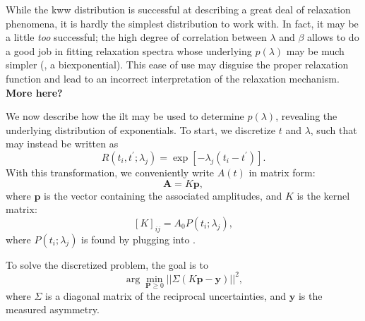 While the \gls{kww} distribution is successful at describing a great deal of relaxation phenomena, it is hardly the simplest distribution to work with.
In fact, it may be a little \emph{too} successful;
the high degree of correlation between $\lambda$ and $\beta$ allows  to do a good job in fitting relaxation spectra whose underlying $p ( \lambda )$ may be much simpler (, a biexponential).
This ease of use may disguise the proper relaxation function and lead to an incorrect interpretation of the relaxation mechanism.
\textbf{More here?}

We now describe how the \gls{ilt} may be used to determine $p ( \lambda )$, revealing the underlying distribution of exponentials.
To start, we discretize $t$ and $\lambda$, such that  may instead be written as
%
\begin{equation} \label{eq:slr-discrete}
   R \left (t_{i}, t^{\prime};\lambda_j \right ) = \exp \left [- \lambda_{j} \left ( t_{i} - t^{\prime} \right ) \right ] .
\end{equation}
%
With this transformation, we conveniently write $A(t)$ in matrix form:
%
\begin{equation} \label{eq:signal-matrix}
   \mathbf{A} = K \mathbf{p},
\end{equation}
%
where $\mathbf{p}$ is the vector containing the associated amplitudes, and $K$ is the kernel matrix:
%
\begin{equation}
   \label{eq:kernel}
   [K]_{ij} = A_{0} P(t_i;\lambda_j),
\end{equation}
%
where $P(t_i;\lambda_j)$ is found by plugging  into .
%
%


To solve the discretized problem, the goal is to
%
\begin{equation}
   \label{eq:onnls}
   \arg \min_{\mathbf{P} \geq 0} || \Sigma \left ( K \mathbf{p} - \mathbf{y} \right ) ||^{2} ,
\end{equation}
%
where $\Sigma$ is a diagonal matrix of the reciprocal uncertainties, and $\mathbf{y}$ is the measured asymmetry. 


